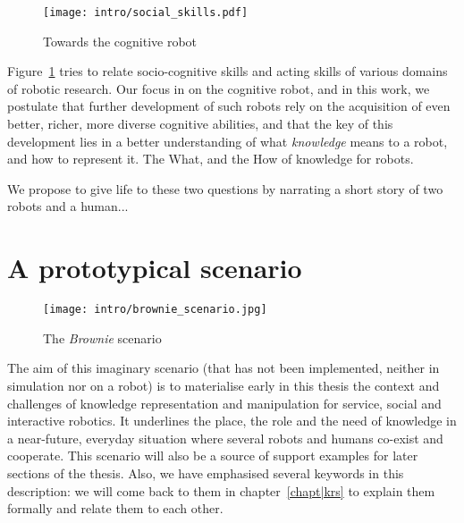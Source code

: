 \begin{figure}
    \centering
    \texttt{[image: intro/social\_skills.pdf]}
    \caption{Towards the cognitive robot}
    \label{fig|cognitive-robots}
\end{figure}

Figure~\ref{fig|cognitive-robots} tries to relate socio-cognitive skills and
acting skills of various domains of robotic research. Our focus in on the
cognitive robot, and in this work, we postulate that further development of
such robots rely on the acquisition of even better, richer, more diverse
cognitive abilities, and that the key of this development lies in a better
understanding of what \emph{knowledge} means to a robot, and how to represent
it. The What, and the How of knowledge for robots.

% 
% 
% 

We propose to give life to these two questions by narrating a short story of
two robots and a human...


\section{A prototypical scenario}
\label{sect|scenario}

\begin{figure*}
	\centering
	\texttt{[image: intro/brownie\_scenario.jpg]}
	\caption{The {\em Brownie} scenario}
	\label{fig|scenario}
\end{figure*}

The aim of this imaginary scenario (that has not been implemented, neither in
simulation nor on a robot) is to materialise early in this thesis the context
and challenges of knowledge representation and manipulation for service, social
and interactive robotics. It underlines the place, the role and the need of
knowledge in a near-future, everyday situation where several robots and humans
co-exist and cooperate. This scenario will also be a source of support examples
for later sections of the thesis. Also, we have emphasised several keywords in
this description: we will come back to them in chapter~\ref{chapt|krs} to
explain them formally and relate them to each other.

